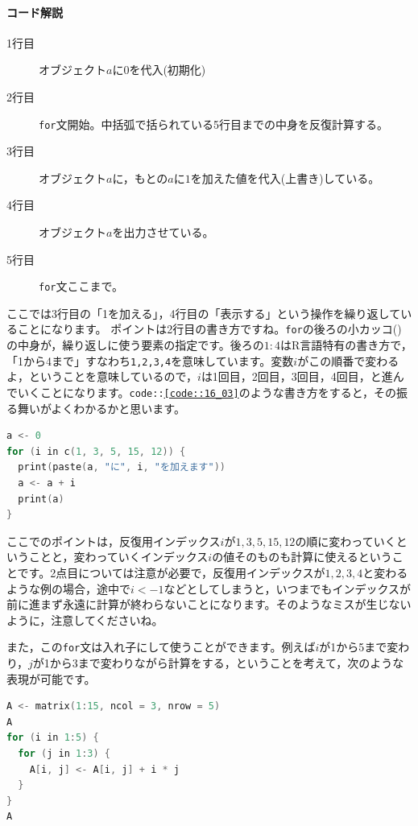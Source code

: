 \documentclass{ltjsbook}
\begin{document}
\paragraph{コード解説}
\begin{description}
        \item[1行目] オブジェクト$a$に$0$を代入(初期化)
        \item[2行目] \texttt{for}文開始。中括弧で括られている5行目までの中身を反復計算する。
        \item[3行目] オブジェクト$a$に，もとの$a$に$1$を加えた値を代入(上書き)している。
        \item[4行目] オブジェクト$a$を出力させている。
        \item[5行目] \texttt{for}文ここまで。
\end{description}

ここでは3行目の「1を加える」，4行目の「表示する」という操作を繰り返していることになります。
ポイントは2行目の書き方ですね。\texttt{for}の後ろの小カッコ()の中身が，繰り返しに使う要素の指定です。後ろの$1:4$はR言語特有の書き方で，「1から4まで」すなわち\verb|1,2,3,4|を意味しています。変数$i$がこの順番で変わるよ，ということを意味しているので，$i$は1回目，2回目，3回目，4回目，と進んでいくことになります。\texttt{code::\ref{code::16_03}}のような書き方をすると，その振る舞いがよくわかるかと思います。

\begin{lstlisting}[language=c++,label={code::16_03},caption={反復操作2}]
a <- 0
for (i in c(1, 3, 5, 15, 12)) {
  print(paste(a, "に", i, "を加えます"))
  a <- a + i
  print(a)
}
\end{lstlisting}

ここでのポイントは，反復用インデックス$i$が$1,3,5,15,12$の順に変わっていくということと，変わっていくインデックス$i$の値そのものも計算に使えるということです。2点目については注意が必要で，反復用インデックスが$1,2,3,4$と変わるような例の場合，途中で$i <- 1$などとしてしまうと，いつまでもインデックスが前に進まず永遠に計算が終わらないことになります。そのようなミスが生じないように，注意してくださいね。

また，この\verb|for|文は入れ子にして使うことができます。例えば$i$が1から5まで変わり，$j$が1から3まで変わりながら計算をする，ということを考えて，次のような表現が可能です。
\begin{lstlisting}[language=c++,label={code::16_02},caption={反復操作1}]
A <- matrix(1:15, ncol = 3, nrow = 5)
A
for (i in 1:5) {
  for (j in 1:3) {
    A[i, j] <- A[i, j] + i * j
  }
}
A
\end{lstlisting}
\end{document}

